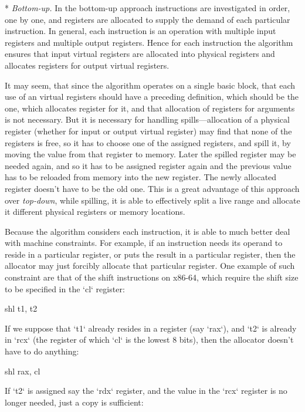 * {\em Bottom-up.} In the bottom-up approach instructions are investigated in
order, one by one, and registers are allocated to supply the demand of each
particular instruction. In general, each instruction is an operation with
multiple input registers and multiple output registers. Hence for each
instruction the algorithm ensures that input virtual registers are allocated
into physical registers and allocates registers for output virtual registers.

It may seem, that since the algorithm operates on a single basic block, that each
use of an virtual registers should have a preceding definition, which should be
the one, which allocates register for it, and that allocation of registers for
arguments is not necessary. But it is necessary for handling spills---allocation
of a physical register (whether for input or output virtual register) may find
that none of the registers is free, so it has to choose one of the assigned
registers, and spill it, by moving the value from that register to memory. Later
the spilled register may be needed again, and so it has to be assigned register
again and the previous value has to be reloaded from memory into the new
register. The newly allocated register doesn't have to be the old one. This is a
great advantage of this approach over {\em top-down}, while spilling, it is able
to effectively split a live range and allocate it different physical registers
or memory locations.

Because the algorithm considers each instruction, it is able to much better deal
with machine constraints. For example, if an instruction needs its operand to
reside in a particular register, or puts the result in a particular register,
then the allocator may just forcibly allocate that particular register. One
example of such constraint are that of the shift instructions on x86-64, which
require the shift size to be specified in the `cl` register:

\begtt
shl t1, t2 %
\endtt

If we suppose that `t1` already resides in a register (say `rax`), and `t2` is
already in `rcx` (the register of which `cl` is the lowest 8 bits), then the
allocator doesn't have to do anything:

\begtt
shl rax, cl %
\endtt

If `t2` is assigned say the `rdx` register, and the value in the `rcx` register
is no longer needed, just a copy is sufficient:

